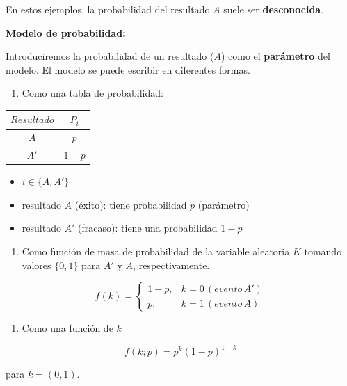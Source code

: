 \documentclass[
]{book}
\providecommand{\tightlist}{%
  \setlength{\itemsep}{0pt}\setlength{\parskip}{0pt}}
\begin{document}
En estos ejemplos, la probabilidad del resultado \(A\) suele ser \textbf{desconocida}.

\textbf{Modelo de probabilidad:}

Introduciremos la probabilidad de un resultado (\(A\)) como el \textbf{parámetro} del modelo. El modelo se puede escribir en diferentes formas.

\begin{enumerate}
\def\labelenumi{\arabic{enumi})}
\tightlist
\item
  Como una tabla de probabilidad:
\end{enumerate}

\begin{longtable}[]{@{}cc@{}}
\toprule\noalign{}
\(Resultado\) & \(P_i\) \\
\midrule\noalign{}
\endhead
\bottomrule\noalign{}
\endlastfoot
\(A\) & \(p\) \\
\(A'\) & \(1-p\) \\
\end{longtable}

\begin{itemize}
\tightlist
\item
  \(i \in \{A,A'\}\)
\item
  resultado \(A\) (éxito): tiene probabilidad \(p\) (parámetro)
\item
  resultado \(A'\) (fracaso): tiene una probabilidad \(1-p\)
\end{itemize}

\begin{enumerate}
\def\labelenumi{\arabic{enumi})}
\setcounter{enumi}{1}
\tightlist
\item
  Como función de masa de probabilidad de la variable aleatoria \(K\) tomando valores \(\{0, 1\}\) para \(A'\) y \(A\), respectivamente.
\end{enumerate}

\[
    f(k)= 
\begin{cases}
    1-p,&  k=0\, (evento\, A')\\
    p,& k=1\, (evento\, A) 
\end{cases}
\]

\begin{enumerate}
\def\labelenumi{\arabic{enumi})}
\setcounter{enumi}{2}
\tightlist
\item
  Como una función de \(k\)
\end{enumerate}

\[f(k; p)=p^k(1-p)^{1-k} \]

para \(k=(0,1)\).
\end{document}
